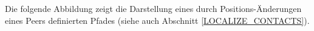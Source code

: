 \enlargethispage{3\baselineskip} %
Die folgende Abbildung
zeigt die Darstellung eines durch Positions-Änderungen eines Peers definierten Pfades (siehe auch Abschnitt \ref{LOCALIZE_CONTACTS}).
\begin{table}[H]
\begin{adjustwidth}{-1.5cm}{1.5cm}
\begin{center}
  \begin{tabulary}{20cm}{ C C
\end{center}
\end{adjustwidth}
\end{table}
